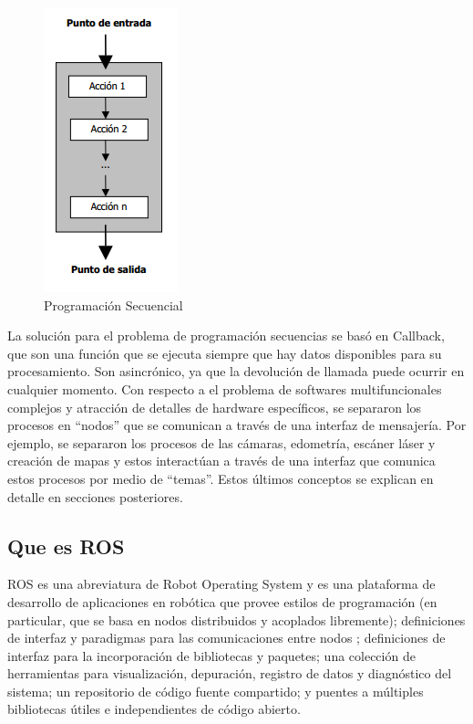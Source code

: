         \begin{figure}[htbp]
            \centering
            \includegraphics[width=0.25\linewidth]{Main/Chapter3/Images3/agrupar_problem_111.png}
            \caption{Programación Secuencial}
            \label{f:Cap3-4_entidades_ini_ros_1}
        \end{figure}
        
    La solución para el problema de programación secuencias se basó en Callback, que son una función que se ejecuta siempre que hay datos disponibles para su procesamiento. Son asincrónico, ya que la devolución de llamada puede ocurrir en cualquier momento. Con respecto a el problema de softwares multifuncionales complejos y atracción de detalles de hardware específicos, se separaron los procesos en “nodos” que se comunican a través de una interfaz de mensajería. Por ejemplo, se separaron los procesos de las cámaras, edometría, escáner láser y creación de mapas y estos interactúan a través de una interfaz que comunica estos procesos por medio de “temas”. Estos últimos conceptos se explican en detalle en secciones posteriores.

    \newpage


    \subsection{Que es ROS}
       ROS es una abreviatura de  Robot Operating System y es una plataforma de desarrollo de aplicaciones en robótica que provee estilos de programación (en particular, que se basa en nodos distribuidos y acoplados libremente); definiciones de interfaz y paradigmas para las comunicaciones entre nodos ; definiciones de interfaz para la incorporación de bibliotecas y paquetes; una colección de herramientas para visualización, depuración, registro de datos y diagnóstico del sistema; un repositorio de código fuente compartido; y puentes a múltiples bibliotecas útiles e independientes de código abierto.
       

